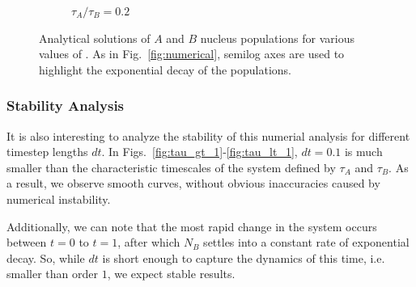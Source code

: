 \documentclass[pra,twocolumn,showpacs,amsmath,amssymb]{revtex4-1}
\begin{document}
\begin{figure}
\begin{subfigure}{.8\linewidth}
    \caption{$\tau_A / \tau_B=0.2$}
    \label{fig:exact_tau_lt_1}
  \end{subfigure}

  \caption{Analytical solutions of $A$ and $B$ nucleus populations for various values of \trel.
  As in Fig.~\ref{fig:numerical}, semilog axes are used to highlight the
  exponential decay of the populations.}
  \label{fig:analytical}
\end{figure}

\subsubsection{Stability Analysis}\label{sec:stability}

It is also interesting to analyze the stability of this numerial analysis for
different timestep lengths $dt$. In Figs.~\ref{fig:tau_gt_1}-\ref{fig:tau_lt_1},
$dt=0.1$ is much smaller than the characteristic timescales of the system defined
by $\tau_A$ and $\tau_B$. As a result, we observe smooth curves, without obvious
inaccuracies caused by numerical instability.

Additionally, we can note that the most rapid change in the system occurs between
$t=0$ to $t=1$, after which $N_B$ settles into a constant
rate of exponential decay. So, while $dt$ is short enough to capture the dynamics
of this time, i.e. smaller than order $1$, we expect stable results.
\end{document}
